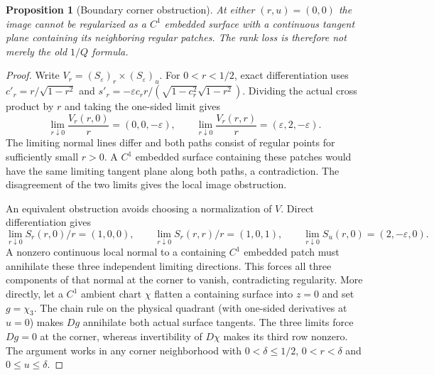 \documentclass[11pt,a4paper]{article}
\newtheorem{proposition}[theorem]{Proposition}
\theoremstyle{definition}\newtheorem{definition}[theorem]{Definition}
\theoremstyle{remark}\newtheorem{remark}[theorem]{Remark}
\begin{document}
\begin{proposition}[Boundary corner obstruction]\label{prop:corner}
At either $(r,u)=(0,0)$ the image cannot be regularized as a $C^1$ embedded
surface with a continuous tangent plane containing its neighboring regular
patches. The rank loss is therefore not merely the old $1/Q$ formula.
\end{proposition}
\begin{proof}
Write $V_r=(S_\varepsilon)_r\times(S_\varepsilon)_u$.
For $0<r<1/2$, exact differentiation uses
$c'_r=r/\sqrt{1-r^2}$ and
$s'_r=-\varepsilon c_r r/(\sqrt{1-c_r^2}\sqrt{1-r^2})$.
Dividing the actual cross product by $r$ and taking the one-sided limit gives
\[
 \lim_{r\downarrow0}\frac{V_r(r,0)}r=(0,0,-\varepsilon),\qquad
 \lim_{r\downarrow0}\frac{V_r(r,r)}r=(\varepsilon,2,-\varepsilon).
\]
The limiting normal lines differ and both paths consist of regular points
for sufficiently small $r>0$. A $C^1$ embedded surface containing these
patches would have the same limiting tangent plane along both paths, a
contradiction. The disagreement of the two limits gives the local image obstruction.

An equivalent obstruction avoids choosing a normalization of $V$.
Direct differentiation gives
\[
 \lim_{r\downarrow0}S_r(r,0)/r=(1,0,0),\qquad
 \lim_{r\downarrow0}S_r(r,r)/r=(1,0,1),\qquad
 \lim_{r\downarrow0}S_u(r,0)=(2,-\varepsilon,0).
\]
A nonzero continuous local normal to a containing $C^1$ embedded patch
must annihilate these three independent limiting directions. This forces
all three components of that normal at the corner to vanish, contradicting
regularity. More directly, let a $C^1$ ambient chart $\chi$ flatten a
containing surface into $z=0$ and set $g=\chi_3$. The chain rule on the
physical quadrant (with one-sided derivatives at $u=0$) makes $Dg$
annihilate both actual surface tangents. The three limits force $Dg=0$
at the corner, whereas invertibility of $D\chi$ makes its third row
nonzero. The argument works in any corner neighborhood with
$0<\delta\leq1/2$, $0<r<\delta$ and $0\leq u\leq\delta$.

\end{proof}
\end{document}
